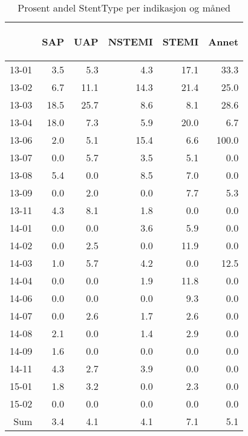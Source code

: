 \documentclass[presentation,xcolor=pdftex,dvipsnames,table]{beamer}
\begin{document}
\begin{frame}
\begin{tiny}
\begin{table}[ht]
\centering
\begin{tabular}{rrrrrr}
  \toprule
 & \begin{sideways} SAP \end{sideways} & \begin{sideways} UAP \end{sideways} & \begin{sideways} NSTEMI \end{sideways} & \begin{sideways} STEMI \end{sideways} & \begin{sideways} Annet \end{sideways} \\ 
  \midrule
13-01 & 3.5 & 5.3 & 4.3 & 17.1 & 33.3 \\ 
  13-02 & 6.7 & 11.1 & 14.3 & 21.4 & 25.0 \\ 
  13-03 & 18.5 & 25.7 & 8.6 & 8.1 & 28.6 \\ 
  13-04 & 18.0 & 7.3 & 5.9 & 20.0 & 6.7 \\ 
  13-06 & 2.0 & 5.1 & 15.4 & 6.6 & 100.0 \\ 
  13-07 & 0.0 & 5.7 & 3.5 & 5.1 & 0.0 \\ 
  13-08 & 5.4 & 0.0 & 8.5 & 7.0 & 0.0 \\ 
  13-09 & 0.0 & 2.0 & 0.0 & 7.7 & 5.3 \\ 
  13-11 & 4.3 & 8.1 & 1.8 & 0.0 & 0.0 \\ 
  14-01 & 0.0 & 0.0 & 3.6 & 5.9 & 0.0 \\ 
  14-02 & 0.0 & 2.5 & 0.0 & 11.9 & 0.0 \\ 
  14-03 & 1.0 & 5.7 & 4.2 & 0.0 & 12.5 \\ 
  14-04 & 0.0 & 0.0 & 1.9 & 11.8 & 0.0 \\ 
  14-06 & 0.0 & 0.0 & 0.0 & 9.3 & 0.0 \\ 
  14-07 & 0.0 & 2.6 & 1.7 & 2.6 & 0.0 \\ 
  14-08 & 2.1 & 0.0 & 1.4 & 2.9 & 0.0 \\ 
  14-09 & 1.6 & 0.0 & 0.0 & 0.0 & 0.0 \\ 
  14-11 & 4.3 & 2.7 & 3.9 & 0.0 & 0.0 \\ 
  15-01 & 1.8 & 3.2 & 0.0 & 2.3 & 0.0 \\ 
  15-02 & 0.0 & 0.0 & 0.0 & 0.0 & 0.0 \\ 
  Sum & 3.4 & 4.1 & 4.1 & 7.1 & 5.1 \\ 
   \bottomrule
\end{tabular}
\caption{Prosent andel StentType per indikasjon og måned} 
\end{table}\end{tiny}
\end{frame}
\end{document}
